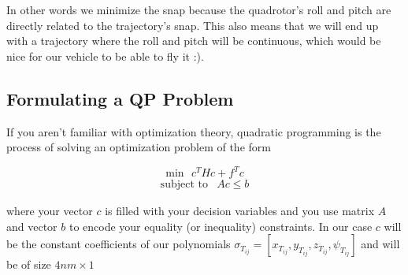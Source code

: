\documentclass{article}
\begin{document}
In other words we minimize the snap because the quadrotor's roll and pitch are directly related to the trajectory's snap. This also means that we will end up with a trajectory where the roll and pitch will be continuous, which would be nice for our vehicle to be able to fly it :).

\subsection{Formulating a QP Problem}
If you aren't familiar with optimization theory, quadratic programming is the process of solving an optimization problem of the form 

\[
\text{min}\ \ \ c^THc+f^Tc
\]\[
	\begin{array}{ll}
	\text{subject to} & Ac\leq b
	\end{array}
\]

where your vector $c$ is filled with your decision variables and you use matrix $A$ and vector $b$ to encode your equality (or inequality) constraints. In our case $c$ will be the constant coefficients of our polynomials $\sigma_{T_{ij}} = [x_{T_{ij}}, y_{T_{ij}}, z_{T_{ij}}, \psi_{T_{ij}}]$ and will be of size $4nm \times 1$
\end{document}
